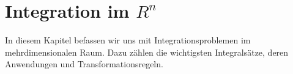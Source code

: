 \chapter{Integration im $R^n$} 
In diesem Kapitel befassen wir uns mit Integrationsproblemen im mehrdimensionalen Raum. Dazu zählen die wichtigsten Integralsätze, deren Anwendungen und Transformationsregeln.
	
	
	
	
	
	